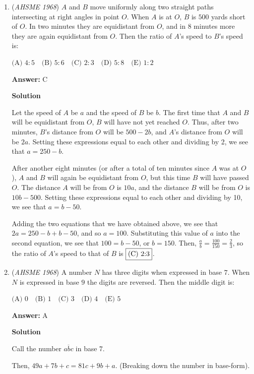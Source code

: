 \begin{enumerate}
 


	\item (\textit{AHSME 1968}) $A$ and $B$ move uniformly along two straight paths intersecting at right angles in point $O$. When $A$ is at $O$, $B$ is $500$ yards short of $O$. In two minutes they are equidistant from $O$, and in $8$ minutes more they are again equidistant from $O$. Then the ratio of $A$'s speed to $B$'s speed is:


 $\text{(A) } 4:5\quad \text{(B) } 5:6\quad \text{(C) } 2:3\quad \text{(D) } 5:8\quad \text{(E) } 1:2$

 \textbf{Answer: }C



\textbf{Solution}

Let the speed of $A$ be $a$ and the speed of $B$ be $b$. The first time that $A$ and $B$ will be equidistant from $O$, $B$ will have not yet reached $O$. Thus, after two minutes, $B$'s distance from $O$ will be $500-2b$, and $A$'s distance from $O$ will be $2a$. Setting these expressions equal to each other and dividing by 2, we see that $a=250-b$.

 After another eight minutes (or after a total of ten minutes since $A$ was at $O$), $A$ and $B$ will again be equidistant from $O$, but this time $B$ will have passed $O$. The distance $A$ will be from $O$ is $10a$, and the distance $B$ will be from $O$ is $10b-500$. Setting these expressions equal to each other and dividing by 10, we see that $a=b-50$.

 Adding the two equations that we have obtained above, we see that $2a=250-b+b-50$, and so $a=100$. Substituting this value of $a$ into the second equation, we see that $100=b-50$, or $b=150$. Then, $\frac{a}{b}=\frac{100}{150}=\frac{2}{3}$, so the ratio of $A$'s speed to that of $B$ is $\fbox{(C) 2:3}$.

 


	\item (\textit{AHSME 1968}) A number $N$ has three digits when expressed in base $7$. When $N$ is expressed in base $9$ the digits are reversed. Then the middle digit is:


 $\text{(A) } 0\quad \text{(B) } 1\quad \text{(C) } 3\quad \text{(D) } 4\quad \text{(E) } 5$

 \textbf{Answer: }A



\textbf{Solution}

Call the number $\overline{abc}$ in base 7.

 Then, $49a+7b+c=81c+9b+a$. (Breaking down the number in base-form).


\end{enumerate}
